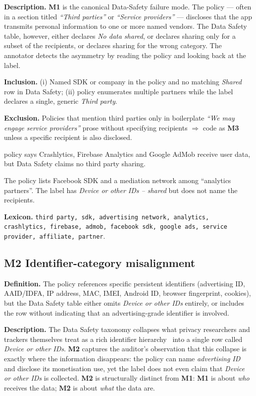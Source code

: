 \documentclass[11pt,a4paper]{article}
\newcommand{\code}[1]{\textsf{\textbf{#1}}}
\begin{document}
\textbf{Description.} \code{M1} is the canonical Data-Safety failure
mode. The policy --- often in a section titled
\textit{``Third parties''} or \textit{``Service providers''} ---
discloses that the app transmits personal information to one or more
named vendors. The Data Safety table, however, either declares
\textsl{No data shared}, or declares sharing only for a subset of the
recipients, or declares sharing for the wrong category. The annotator
detects the asymmetry by reading the policy and looking back at the
label.

\textbf{Inclusion.} (i) Named SDK or company in the policy and no
matching \textsl{Shared} row in Data Safety; (ii) policy enumerates
multiple partners while the label declares a single, generic
\textsl{Third party}.

\textbf{Exclusion.} Policies that mention third parties only in
boilerplate \textit{``We may engage service providers''} prose without
specifying recipients $\Rightarrow$ code as \code{M3} unless a specific
recipient is also disclosed.

\begin{rationale}
[APP-$0148$] policy says Crashlytics, Firebase Analytics and Google
AdMob receive user data, but Data Safety claims no third party
sharing.
\end{rationale}
\begin{rationale}
The policy lists Facebook SDK and a mediation network among
``analytics partners''. The label has \textsl{Device or other IDs --
shared} but does not name the recipients.
\end{rationale}

\textbf{Lexicon.} \texttt{third party, sdk, advertising network,
analytics, crashlytics, firebase, admob, facebook sdk, google ads,
service provider, affiliate, partner}.

\subsection{\code{M2} Identifier-category misalignment}
\label{sec:M2}
\textbf{Definition.} The policy references specific persistent
identifiers (advertising ID, AAID/IDFA, IP address, MAC, IMEI, Android
ID, browser fingerprint, cookies), but the Data Safety table either
omits \textsl{Device or other IDs} entirely, or includes the row
without indicating that an advertising-grade identifier is involved.

\textbf{Description.} The Data Safety taxonomy collapses what privacy
researchers and trackers themselves treat as a rich identifier
hierarchy~\citep{razaghpanah2018apps,reardon2019fifty} into a single
row called \textsl{Device or other IDs}. \code{M2} captures the
auditor's observation that this collapse is exactly where the
information disappears: the policy can name \emph{advertising ID} and
disclose its monetisation use, yet the label does not even claim that
\textsl{Device or other IDs} is collected. \code{M2} is structurally
distinct from \code{M1}: \code{M1} is about \emph{who} receives the
data; \code{M2} is about \emph{what} the data are.
\end{document}
